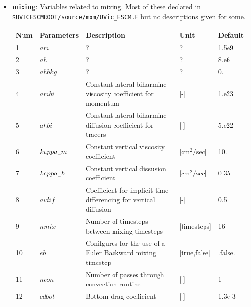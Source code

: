 \documentclass[a4paper]{article}
\begin{document}
\begin{itemize}
\item \textbf{mixing}: Variables related to mixing. Most of these declared in \verb|$UVICESCMROOT/source/mom/UVic_ESCM.F| but no descriptions given for some.
{\footnotesize
\begin{longtable}{lllll} \hline
  Num  & Parameters         & Description                                                                      & Unit                  & Default    \\ \hline 
  1    & $am$               & ?                                                                                & ?                     & 1.5e9   \\
  2    & $ah$               & ?                                                                                & ?                     & 8.e6    \\
  3    & $ahbkg$            & ?                                                                                & ?                     & 0.    \\
  4    & $ambi$             & Constant lateral biharminc viscosity coefficient for momentum                    & [-]                   & 1.e23    \\
  5    & $ahbi$             & Constant lateral biharminc diffusion coefficient for tracers                     & [-]                   & 5.e22    \\  
  6    & $kappa\verb|_|m$   & Constant vertical viscosity coefficient                                          & [$\mathrm{cm^2/sec}$] & 10.    \\    
  7    & $kappa\verb|_|h$   & Constant vertical dissusion coefficient                                          & [$\mathrm{cm^2/sec}$] & 0.35    \\    
  8    & $aidif$            & Coefficient for implicit time differencing for vertical diffusion                & [-]                   & 0.5    \\   
  9    & $nmix$             & Number of timesteps between mixing timesteps                                     & [timesteps]           & 16    \\    
  10   & $eb$               & Conifgures for the use of a Euler Backward mixing timestep                       & [true,false]          & .false.    \\    
  11   & $ncon$             & Number of passes through convection routine                                      & [-]                   & 1    \\    
  12   & $cdbot$            & Bottom drag coefficient                                                          & [-]                   & 1.3e-3    \\    

\end{longtable}}
\end{itemize}
\end{document}
